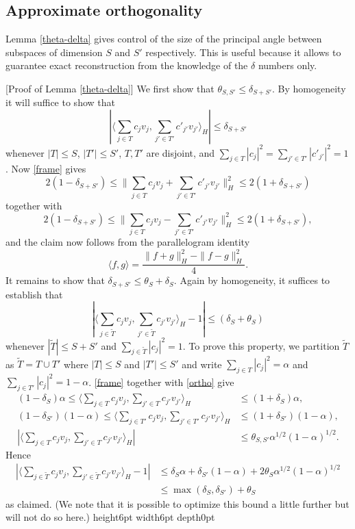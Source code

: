 \documentclass[11pt]{article}
\newenvironment{proof}{\noindent {\bf Proof} }{\endprf\par}
\def \endprf{\hfill {\vrule height6pt width6pt depth0pt}\medskip}
\newcommand{\<}{\langle}
\renewcommand{\>}{\rangle}
\numberwithin{equation}{section}
\begin{document}
\subsection{Approximate orthogonality}
\label{sec:uop}

Lemma \ref{theta-delta} gives control of the size of the principal
angle between subspaces of dimension $S$ and $S'$ respectively. This
is useful because it allows to guarantee exact reconstruction from the
knowledge of the $\delta$ numbers only.

\begin{proof}[Proof of Lemma \ref{theta-delta}]
  We first show that $\theta_{S,S'} \leq \delta_{S+S'}$.  By
  homogeneity it will suffice to show that
  $$
  |\langle \sum_{j \in T} c_j v_j, \sum_{j' \in T'} c'_{j'} v_{j'}
  \rangle_{H}| \leq \delta_{S+S'}$$
  whenever $|T| \leq S$, $|T'| \leq
  S'$, $T, T'$ are disjoint, and $\sum_{j \in T} |c_j|^2 = \sum_{j'
    \in T'} |c'_{j'}|^2 = 1$. Now \eqref{frame} gives 
  $$
  2(1-\delta_{S+S'}) \leq \| \sum_{j \in T} c_j v_j + \sum_{j' \in
    T'} c'_{j'} v_{j'} \|_H^2 \leq 2(1+\delta_{S+S'})$$
  together with 
  $$
  2(1-\delta_{S+S'}) \leq \| \sum_{j \in T} c_j v_j - \sum_{j' \in
    T'} c'_{j'} v_{j'} \|_H^2 \leq 2(1+\delta_{S+S'}),$$
  and the claim now
  follows from the parallelogram identity
  $$
  \langle f, g \rangle = \frac{\|f+g\|_H^2 - \|f-g\|_H^2}{4}.
  $$
  It remains to show that $\delta_{S+S'} \leq \theta_S + \delta_S$.
  Again by homogeneity, it suffices to establish that
  $$
  |\langle \sum_{j \in \tilde T} c_j v_j, \sum_{j' \in \tilde T}
  c_{j'} v_{j'} \rangle_{H} - 1| \leq (\delta_{S} + \theta_S)$$
  whenever $|\tilde T| \leq S+S'$ and $\sum_{j \in \tilde T} |c_j|^2 =
  1$.  To prove this property, we partition $\tilde T$ as $\tilde T =
  T \cup T'$ where $|T| \leq S$ and $|T'| \leq S'$ and write $\sum_{j
    \in T} |c_j|^2 = \alpha$ and $\sum_{j \in T'} |c_j|^2 = 1-\alpha$.
  \eqref{frame} together with \eqref{ortho} give
\begin{align*}
  (1-\delta_S) \alpha \leq \langle \sum_{j \in T} c_j v_j, 
\sum_{j' \in T} c_{j'} v_{j'} \rangle_{H} &\leq (1+\delta_S) \alpha,\\
  (1-\delta_{S'}) (1-\alpha) \leq \langle \sum_{j \in T'} c_j v_j, 
\sum_{j' \in T'} c_{j'} v_{j'} \rangle_{H} &\leq (1+\delta_{S'}) (1-\alpha),\\
  |\langle \sum_{j \in T} c_j v_j, \sum_{j' \in T} c_{j'} v_{j'}
  \rangle_{H}| &\leq \theta_{S,S'} \alpha^{1/2} (1-\alpha)^{1/2}. 
\end{align*}
Hence
\begin{align*}
  |\langle \sum_{j \in \tilde T} c_j v_j, \sum_{j' \in \tilde T}
  c_{j'} v_{j'} \rangle_{H} - 1| &\leq \delta_S \alpha + \delta_{S'}
  (1-\alpha)
  + 2 \theta_S \alpha^{1/2} (1-\alpha)^{1/2} \\
  &\leq \max(\delta_S,\delta_{S'}) + \theta_S
\end{align*}
as claimed.  (We note that it is possible to optimize this bound a
little further but will not do so here.)
\end{proof}
\end{document}
